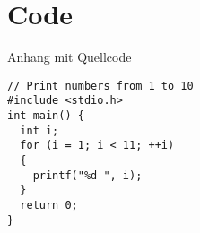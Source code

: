 

\section{Code}
Anhang mit Quellcode

\begin{lstlisting}[caption={[For-Schleife] For-Schleife die die Zahlen von 1 bis 10 ausgiebt}]
// Print numbers from 1 to 10
#include <stdio.h>
int main() {
  int i;
  for (i = 1; i < 11; ++i)
  {
    printf("%d ", i);
  }
  return 0;
}
\end{lstlisting}

